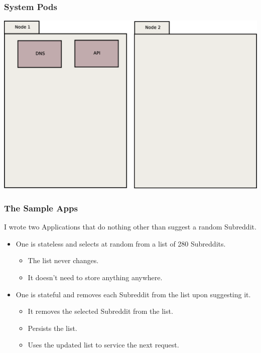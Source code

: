 \documentclass{beamer}
\begin{document}
\begin{frame}
    \frametitle{System Pods}
    \includegraphics[width=\textwidth,height=0.85\textheight,keepaspectratio]{graphics/01-systemPods.eps}
\end{frame}

\begin{frame}
    \frametitle{The Sample Apps}
    I wrote two Applications that do nothing other than suggest a random Subreddit.
    \begin{itemize}
        \item One is stateless and selects at random from a list of 280 Subreddits.
        \begin{itemize}
            \item The list never changes.
            \item It doesn't need to store anything anywhere.
        \end{itemize}
        \item One is stateful and removes each Subreddit from the list upon suggesting it.
        \begin{itemize}
            \item It removes the selected Subreddit from the list.
            \item Persists the list.
            \item Uses the updated list to service the next request.
        \end{itemize}
    \end{itemize}
\end{frame}
\end{document}
